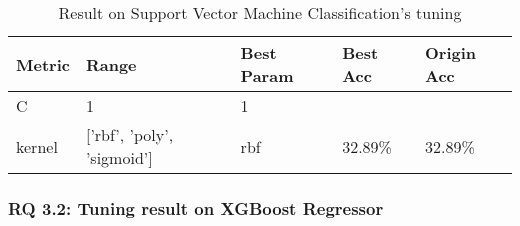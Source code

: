 \begin{table}[]
\begin{tabular}{|l|l|l|l|l|}
\hline
{\color[HTML]{000000} \textbf{Metric}} & {\color[HTML]{000000} \textbf{Range}}                 & {\color[HTML]{000000} \textbf{Best Param}} & {\color[HTML]{000000} \textbf{Best Acc}}         & {\color[HTML]{000000} \textbf{Origin Acc}}       \\ \hline
{\color[HTML]{000000} C}               & {\color[HTML]{000000} 1}                              & {\color[HTML]{000000} 1}                   & {\color[HTML]{000000} }                          & {\color[HTML]{000000} }                          \\ \cline{1-3}
{\color[HTML]{000000} kernel}          & {\color[HTML]{000000} {[}'rbf', 'poly', 'sigmoid'{]}} & {\color[HTML]{000000} rbf}                 & \multirow{-2}{*}{{\color[HTML]{000000} 32.89\%}} & \multirow{-2}{*}{{\color[HTML]{000000} 32.89\%}} \\ \hline
\end{tabular}
\label{tblRQ31}
\caption{Result on Support Vector Machine Classification's tuning}
\end{table}

\subsubsection{RQ 3.2: Tuning result on XGBoost Regressor}

